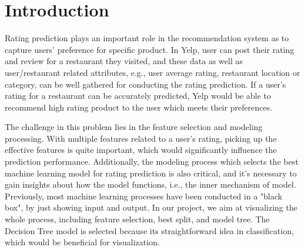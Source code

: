 \section{Introduction}
\label{sec:intro}


Rating prediction plays an important role in the recommendation system as to capture users' preference for specific product. In Yelp, user can post their rating and review for a restaurant they visited, and these data as well as user/restaurant related attributes, e.g., user average rating, restaurant location or category, can be well gathered for conducting the rating prediction. If a user's rating for a restaurant can be accurately predicted, Yelp would be able to recommend high rating product to the user which meets their preferences. 

The challenge in this problem lies in the feature selection and modeling processing. With multiple features related to a user's rating, picking up the effective features is quite important, which would significantly influence the prediction performance. Additionally, the modeling process which selects the best machine learning model for rating prediction is also critical, and it's necessary to gain insights about how the model functions, i.e., the inner mechanism of model. Previously, most machine learning processes have been conducted in a "black box", by just showing input and output. In our project, we aim at visualizing the whole process, including feature selection, best split, and model tree. The Decision Tree model is selected because its straightforward idea in classification, which would be beneficial for visualization. 
